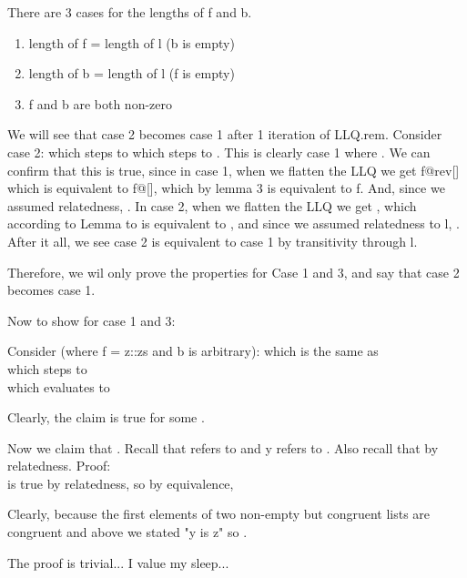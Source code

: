 \documentclass[11pt,letterpaper]{article}
\begin{document}
There are 3 cases for the lengths of f and b.
\begin{enumerate}
\item length of f = length of l (b is empty)
\item length of b = length of l (f is empty)
\item f and b are both non-zero
\end{enumerate}

We will see that case 2 becomes case 1 after 1 iteration of LLQ.rem.
Consider case 2:  which steps to  which steps to
. This is clearly case 1 where . We can confirm that this is true, since in case 1,
when we flatten the LLQ we get f@rev[] which is equivalent to f@[], which by lemma 3 is equivalent to f. And, 
since we assumed relatedness, . In case 2, 
when we flatten the LLQ we get , which according to Lemma to is equivalent to , and since we assumed
relatedness to l, . After it all, we see case 2 is equivalent to case 1 by transitivity through l.

Therefore, we wil only prove the properties for Case 1 and 3, and say that case 2 becomes case 1.

Now to show  for case 1 and 3:

Consider (where f = z::zs and b is arbitrary):
 which is the same as\\
 which steps to\\
 which evaluates to\\

Clearly, the claim is true for some .

Now we claim that . Recall that  refers to  and y  refers to .
Also recall that  by relatedness.
Proof: \\
 is true by relatedness, so by equivalence,\\

Clearly,  because the first elements of two non-empty but congruent lists
are congruent and above we stated "y is z" so .

The proof is trivial... I value my sleep...
\end{document}
